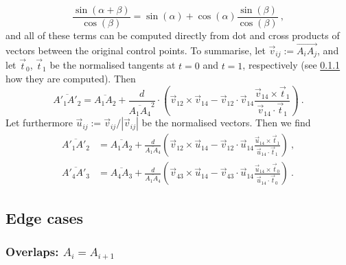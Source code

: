 \documentclass[12pt,a4paper]{article}
\theoremstyle{definition}
\newcommand{\tv}{\vec{t}}
\newcommand{\uv}{\vec{u}}
\newcommand{\vv}{\vec{v}}
\begin{document}
\begin{equation}
  \frac{\sin(\alpha + \beta)}{\cos(\beta)} = \sin(\alpha) + \cos(\alpha) \frac{\sin(\beta)}{\cos(\beta)} \ ,
\end{equation}
and all of these terms can be computed directly from dot and cross products of vectors between the original control points. To summarise, let $\vv_{ij} := \overrightarrow{A_iA_j}$, and let $\tv_0$, $\tv_1$ be the normalised tangents at $t=0$ and $t=1$, respectively (see \cref{subsubsec:tangents} how they are computed). Then
\begin{equation}
  \overline{A'_1A'_2} = \overline{A_1A_2} + \frac{d}{\overline{A_1A_4}^2}\cdot\left(\vv_{12} \times \vv_{14} - \vv_{12}\cdot\vv_{14} \frac{\vv_{14}\times\tv_1}{\vv_{14}\cdot\tv_1} \right) \ .
\end{equation}
Let furthermore $\uv_{ij} := \vv_{ij}/|\vv_{ij}|$ be the normalised vectors. Then we find
\begin{equation}%
  \label{eq:finalPrimeDistance}
  \begin{aligned}
    \overline{A'_1A'_2} &= \overline{A_1A_2} + \frac{d}{\overline{A_1A_4}} \left(\vv_{12} \times \uv_{14} - \vv_{12}\cdot\uv_{14} \frac{\uv_{14}\times\tv_1}{\uv_{14}\cdot\tv_1} \right) \ , \\
    \overline{A'_4A'_3} &= \overline{A_4A_3} + \frac{d}{\overline{A_1A_4}} \left(\vv_{43} \times \uv_{14} - \vv_{43}\cdot\uv_{14} \frac{\uv_{14}\times\tv_0}{\uv_{14}\cdot\tv_0} \right) \ .
  \end{aligned}
\end{equation}



\subsection{Edge cases}

\subsubsection{Overlaps: \texorpdfstring{$A_i = A_{i+1}$}{A\_i = A\_(i+1)}}
\label{subsubsec:tangents}
\end{document}
